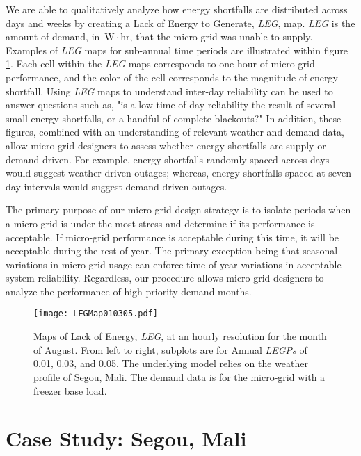 \documentclass[11p]{article}
\newcommand{\unit}[1]{\ensuremath{\, \mathrm{#1}}}
\begin{document}
We are able to qualitatively analyze how energy shortfalls are distributed across days and weeks by creating a Lack of Energy to Generate, \emph{LEG}, map. 
\emph{LEG} is the amount of demand, in \unit{W\! \cdot \! hr}, that the micro-grid was unable to supply.
Examples of \emph{LEG} maps for sub-annual time periods are illustrated within figure \ref{LEGMaps}.
Each cell within the \emph{LEG} maps corresponds to one hour of micro-grid performance, and the color of the cell corresponds to the magnitude of energy shortfall. 
Using \emph{LEG} maps to understand inter-day reliability can be used to answer questions such as, "is a low time of day reliability the result of several small energy shortfalls, or a handful of complete blackouts?" 
In addition, these figures, combined with an understanding of relevant weather and demand data, allow micro-grid designers to assess whether energy shortfalls are supply or demand driven. 
For example, energy shortfalls randomly spaced across days would suggest weather driven outages; whereas, energy shortfalls spaced at seven day intervals would suggest demand driven outages. 


The primary purpose of our micro-grid design strategy is to isolate periods when a micro-grid is under the most stress and determine if its performance is acceptable.
If micro-grid performance is acceptable during this time, it will be acceptable during the rest of year.
The primary exception being that seasonal variations in micro-grid usage can enforce time of year variations in acceptable system reliability. 
Regardless, our procedure allows micro-grid designers to analyze the performance of high priority demand months. 



\begin{figure}[ht] 
  \centering
    \texttt{[image: LEGMap010305.pdf]}
  \caption{Maps of Lack of Energy, \emph{LEG}, at an hourly resolution for the month of August.
   From left to right, subplots are for Annual \emph{LEGPs} of 0.01, 0.03, and 0.05. 
  The underlying model relies on the weather profile of Segou, Mali.
  The demand data is for the micro-grid with a freezer base load.}
\label{LEGMaps}
\end{figure}


\section{Case Study: Segou, Mali} \label{CaseStudy}
\end{document}

